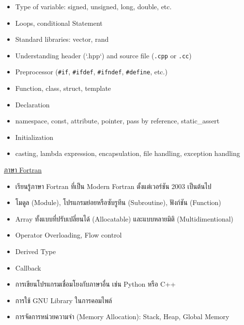 \begin{itemize}[topsep=0pt]
  \item Type of variable: signed, unsigned, long, double, etc.

  \item Loops, conditional Statement

  \item Standard libraries: vector, rand

  \item Understanding header (`.hpp`) and source file (\texttt{.cpp} or \texttt{.cc})

  \item Preprocessor (\texttt{\#if}, \texttt{\#ifdef}, \texttt{\#ifndef}, \texttt{\#define}, etc.)

  \item Function, class, struct, template

  \item Declaration

  \item namespace, const, attribute, pointer, pass by reference, static_assert

  \item Initialization

  \item casting, lambda expression, encapsulation, file handling, exception handling
\end{itemize}

\noindent \underline{ภาษา Fortran}

\begin{itemize}[topsep=0pt]
  \item เรียนรู้ภาษา Fortran ที่เป็น Modern Fortran ตั้งแต่เวอร์ชัน 2003 เป็นต้นไป

  \item โมดูล (Module), โปรแกรมย่อยหรือซับรูทีน (Subroutine), ฟังก์ชัน (Function)

  \item Array ทั้งแบบที่ปรับเปลี่ยนได้ (Allocatable) และแบบหลายมิติ (Multidimentional)

  \item Operator Overloading, Flow control

  \item Derived Type

  \item Callback

  \item การเขียนโปรแกรมเชื่อมโยงกับภาษาอื่น เช่น Python หรือ C++

  \item การใช้ GNU Library ในการคอมไพล์

  \item การจัดการหน่วยความจำ (Memory Allocation): Stack, Heap, Global Memory
\end{itemize}

